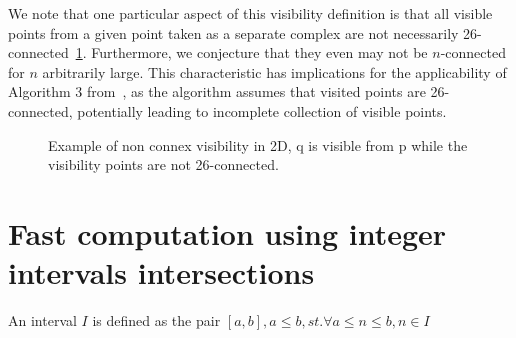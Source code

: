 \documentclass[runningheads]{llncs}
\begin{document}
    We note that one particular aspect of this visibility definition is that all visible points from a given point taken as a separate complex are not necessarily 26-connected~\ref{fig:visibility-2d-not-connected}.
    Furthermore, we conjecture that they even may not be $n$-connected for $n$ arbitrarily large.
    This characteristic has implications for the applicability of Algorithm 3 from~\cite{lachaud:2022-jmiv}, as the algorithm assumes that visited points are 26-connected, potentially leading to incomplete collection of visible points.

    \begin{figure}
        \centering
        \caption{Example of non connex visibility in 2D, q is visible from p while the visibility points are not 26-connected.}
        \label{fig:visibility-2d-not-connected}
    \end{figure}




    \section{Fast computation using integer intervals intersections}

    \begin{definition}
        An interval $I$ is defined as the pair $[a,b], a \leq b, st. \forall a \leq n \leq b, n \in I$
    \end{definition}
\end{document}
